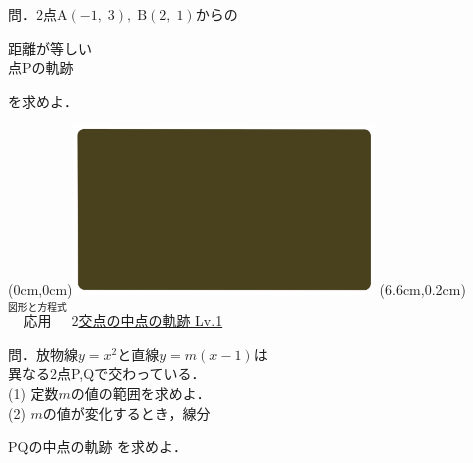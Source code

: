 \documentclass[10pt,
fleqn,
dvipdfmx,
uplatex
]{jsarticle}
\begin{document}
\large 
問．$2$点$\text{A}\left(-1,\;3\right),\;\text{B}\left(2,\;1\right)$からの

\Huge
\vspace{-0.2zw}
\hspace{0.2zw}距離が等しい\vspace{-0.2zw}\\
\hfill 点$\text{P}$の軌跡\hspace{0.2zw}

\large 
\vspace{0.2zw}
\hfill を求めよ．

\newpage

\at(0cm,0cm){\includegraphics[width=8cm,bb=0 0 1920 1080]{./youtube/thumbnails/templates/smart_background/図形と方程式.jpeg}}
\at(6.6cm,0.2cm){\small\color{bradorange}$\overset{\text{図形と方程式}}{\text{応用}}$}
{\color{orange}\Large\underline{$2$交点の中点の軌跡 Lv.1 }}\vspace{0.3zw}

\normalsize
問．放物線$y=x^2$と直線$y=m\left(x-1\right)$は\\
\hfill 異なる$2$点P,\;Qで交わっている． \\
(1)  定数$m$の値の範囲を求めよ．\\
(2)  $m$の値が変化するとき，線分

\huge
\vspace{0.2zw}
\hspace{0.5zw}$\text{PQ}$の中点の軌跡
\normalsize
\vspace{0.2zw}
\hfill を求めよ．\\
\end{document}
